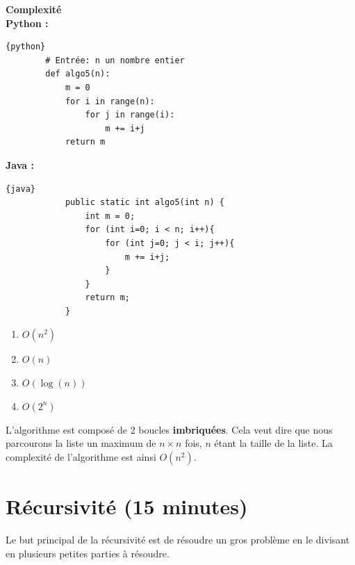 \newpage

\begin{Exercice}[10 minutes] \textbf{Complexité \optionnel} \\        
        \textbf{Python :}
        \begin{lstlisting}{python}
        # Entrée: n un nombre entier
        def algo5(n):
            m = 0
            for i in range(n):
                for j in range(i):
                    m += i+j
            return m
        \end{lstlisting}
        
        \textbf{Java :}
        \begin{lstlisting}{java}
            public static int algo5(int n) {
                int m = 0;
                for (int i=0; i < n; i++){
                    for (int j=0; j < i; j++){
                        m += i+j;
                    }
                }
                return m;
            }
        \end{lstlisting}
    
        \begin{enumerate}
            \item $O(n^2)$
            \item $O(n)$
            \item $O(\log(n))$
            \item $O(2^n)$
        \end{enumerate}

    \begin{solution} 
    L'algorithme est composé de 2 boucles \textbf{imbriquées}. Cela veut dire que nous parcourons la liste un maximum de $n \times n$ fois, $n$ étant la taille de la liste. La complexité de l'algorithme est ainsi $O(n^2)$.
    \end{solution}
    
\end{Exercice}
    
        
\section{Récursivité (15 minutes)}

Le but principal de la récursivité est de résoudre un gros problème en le divisant en plusieurs petites parties à résoudre.

